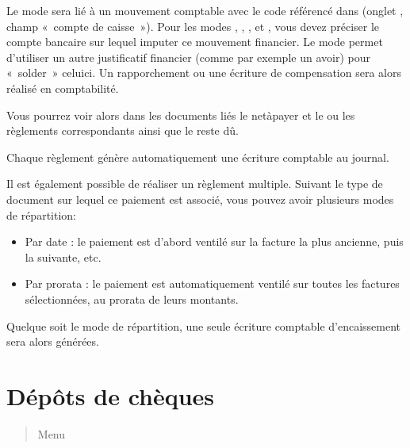\documentclass[a4paper,10pt,oneside,french]{sphinxmanual}
\begin{document}
\sphinxAtStartPar
Le mode  sera lié à un mouvement comptable avec le code référencé dans  (onglet , champ « compte de caisse »).
Pour les modes , , ,  et , vous devez préciser le compte bancaire sur lequel imputer ce mouvement financier.
Le mode  permet d’utiliser un autre justificatif financier (comme par exemple un avoir) pour « solder » celui\sphinxhyphen{}ci. Un rapporchement ou une écriture de compensation sera alors réalisé en comptabilité.

\sphinxAtStartPar
Vous pourrez voir alors dans les documents liés le net\sphinxhyphen{}à\sphinxhyphen{}payer et le ou les règlements correspondants ainsi que le reste dû.

\sphinxAtStartPar
Chaque règlement génère automatiquement une écriture comptable au journal.

\sphinxAtStartPar
Il est également possible de réaliser un règlement multiple.
Suivant le type de document sur lequel ce paiement est associé, vous pouvez avoir plusieurs modes de répartition:
\begin{itemize}
\item {} 
\sphinxAtStartPar
Par date : le paiement est d’abord ventilé sur la facture la plus ancienne, puis la suivante, etc.

\item {} 
\sphinxAtStartPar
Par prorata : le paiement est automatiquement ventilé sur toutes les factures sélectionnées, au prorata de leurs montants.
\begin{quote}

\noindent{}
\end{quote}

\end{itemize}

\sphinxAtStartPar
Quelque soit le mode de répartition, une seule écriture comptable d’encaissement sera alors générées.


\section{Dépôts de chèques}
\label{\detokenize{payoff/deposit:depots-de-cheques}}\label{\detokenize{payoff/deposit::doc}}\begin{quote}

\sphinxAtStartPar
Menu 
\end{quote}
\end{document}
